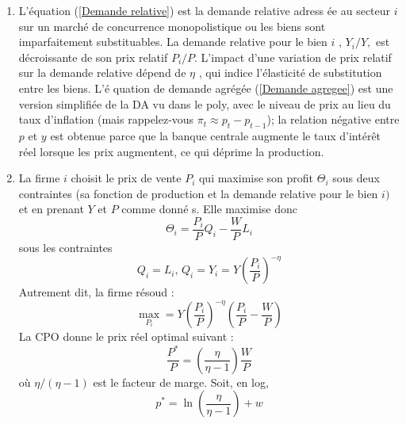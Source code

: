 \documentclass[11pt,a4paper]{article}
\begin{document}
\begin{enumerate}
\item L'\'{e}quation (\ref{Demande relative}) est la demande relative adress%
\'{e}e au secteur $i$ sur un march\'{e} de concurrence monopolistique ou les
biens sont imparfaitement substituables. La demande relative pour le bien $i$%
, $Y_{i}/Y,$ est d\'{e}croissante de son prix relatif $P_{i}/P$. L'impact
d'une variation de prix relatif sur la demande relative d\'{e}pend de $\eta $%
, qui indice l'\'{e}lasticit\'{e} de substitution entre les biens. L'\'{e}%
quation de demande agr\'{e}g\'{e}e (\ref{Demande agregee})  est une version simplifiée de la DA vu dans le poly, avec le niveau de prix au lieu du taux d'inflation (mais rappelez-vous $ \pi_t \approx p_t-p_ {t-1} $); la relation négative entre $ p $ et $ y $ est obtenue parce que la banque centrale augmente le taux d'intérêt réel lorsque les prix augmentent, ce qui déprime la production.


\item La firme $i$ choisit le prix de vente $P_{i}$ qui maximise son profit $\Theta _{i}$ sous deux contraintes (sa fonction de production et la
demande relative pour le bien $i)$ et en prenant $Y$ et $P$ comme donn\'{e}%
s. Elle maximise donc%
\begin{equation*}
\Theta _{i}=\frac{P_{i}}{P}Q_{i}-\frac{W}{P}L_{i}
\end{equation*}%
sous les contraintes%
\begin{equation*}
Q_{i}=L_{i}\text{, \ \ }Q_{i}=Y_{i}=Y\left( \frac{P_{i}}{P}\right) ^{-\eta }
\end{equation*}%
Autrement dit, la firme r\'{e}soud :%
\begin{equation*}
\max_{P_{i}}=Y\left( \frac{P_{i}}{P}\right) ^{-\eta }\left( \frac{P_{i}}{P}-%
\frac{W}{P}\right)
\end{equation*}%
La CPO donne le prix r\'{e}el optimal suivant :%
\begin{equation}
\frac{P^{\ast }}{P}=\left( \frac{\eta }{\eta -1}\right) \frac{W}{P}
\label{Prix reel optimal}
\end{equation}%
o\`{u} $\eta /\left( \eta -1\right) $ est le facteur de marge. Soit, en log, 
\begin{equation*}
p^{\ast }=\ln \left( \frac{\eta }{\eta -1}\right) +w
\end{equation*}%



\end{enumerate}
\end{document}
